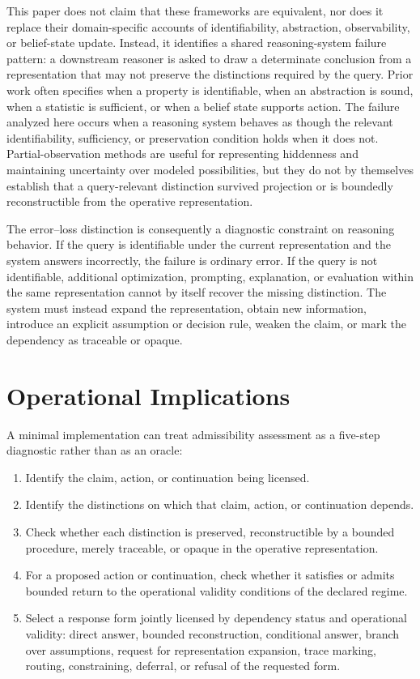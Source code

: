 \documentclass[11pt]{article}
\begin{document}
This paper does not claim that these frameworks are equivalent, nor does it replace their domain-specific accounts of identifiability, abstraction, observability, or belief-state update. Instead, it identifies a shared reasoning-system failure pattern: a downstream reasoner is asked to draw a determinate conclusion from a representation that may not preserve the distinctions required by the query. Prior work often specifies when a property is identifiable, when an abstraction is sound, when a statistic is sufficient, or when a belief state supports action. The failure analyzed here occurs when a reasoning system behaves as though the relevant identifiability, sufficiency, or preservation condition holds when it does not. Partial-observation methods are useful for representing hiddenness and maintaining uncertainty over modeled possibilities, but they do not by themselves establish that a query-relevant distinction survived projection or is boundedly reconstructible from the operative representation.

The error--loss distinction is consequently a diagnostic constraint on reasoning behavior. If the query is identifiable under the current representation and the system answers incorrectly, the failure is ordinary error. If the query is not identifiable, additional optimization, prompting, explanation, or evaluation within the same representation cannot by itself recover the missing distinction. The system must instead expand the representation, obtain new information, introduce an explicit assumption or decision rule, weaken the claim, or mark the dependency as traceable or opaque.

\section{Operational Implications}

A minimal implementation can treat admissibility assessment as a five-step diagnostic rather than as an oracle:

\begin{enumerate}
    \item Identify the claim, action, or continuation being licensed.
    \item Identify the distinctions on which that claim, action, or continuation depends.
    \item Check whether each distinction is preserved, reconstructible by a bounded procedure, merely traceable, or opaque in the operative representation.
    \item For a proposed action or continuation, check whether it satisfies or admits bounded return to the operational validity conditions of the declared regime.
    \item Select a response form jointly licensed by dependency status and operational validity: direct answer, bounded reconstruction, conditional answer, branch over assumptions, request for representation expansion, trace marking, routing, constraining, deferral, or refusal of the requested form.
\end{enumerate}
\end{document}
